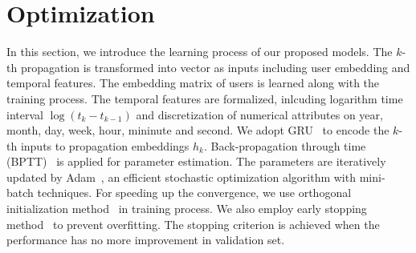 \section{Optimization}

In this section, we introduce the learning process of our proposed models. 
The $k$-th propagation is transformed into vector as inputs including user
embedding and temporal features. The embedding matrix of
users is learned along with the training process. The temporal features
are formalized, inlcuding logarithm time interval
$\log(t_k-t_{k-1})$ and discretization of numerical attributes on year, month,
day, week, hour, mininute and second. We adopt
GRU~\cite{chung2014empirical} to encode the $k$-th inputs to propagation
embeddings $h_k$. Back-propagation through time
(BPTT)~\cite{chauvin1995backpropagation} is applied for parameter estimation.
The parameters are iteratively updated by Adam~\cite{kingma2015method}, an
efficient stochastic optimization algorithm with mini-batch techniques. 
For speeding up the convergence, we use
orthogonal initialization method~\cite{henaff2016orthogonal} in training
process. We also
employ early stopping method~\cite{prechelt1998automatic} to prevent
overfitting. The stopping criterion is achieved when the performance has no
more improvement in validation set. 
